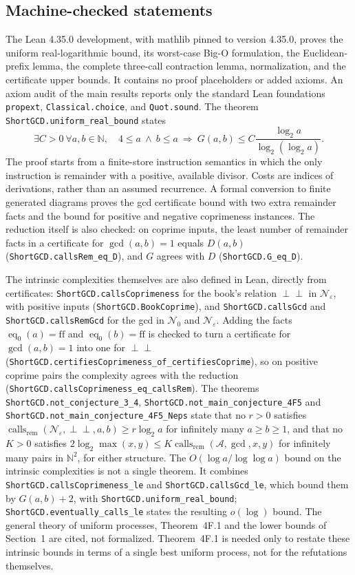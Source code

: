 \documentclass[11pt]{article}
\newcommand{\rem}{\operatorname{rem}}
\newcommand{\calls}{\operatorname{calls}}
\newcommand{\eq}{\operatorname{eq}}
\newcommand{\lean}[1]{\nolinkurl{#1}}
\begin{document}
\subsection{Machine-checked statements}
The Lean 4.35.0 development, with mathlib pinned to version 4.35.0, proves the
uniform real-logarithmic bound, its worst-case Big-O formulation, the
Euclidean-prefix lemma, the complete three-call contraction lemma, normalization,
and the certificate upper bounds. It contains no proof placeholders or added
axioms. An axiom audit of the main results reports only the standard Lean
foundations \texttt{propext}, \texttt{Classical.choice}, and \texttt{Quot.sound}.
The theorem \lean{ShortGCD.uniform_real_bound} states
\[
\exists C>0\ \forall a,b\in\mathbb N,\quad
4\leq a\ \wedge\ b\leq a\ \Longrightarrow\
G(a,b)\leq C\frac{\log_2 a}{\log_2(\log_2 a)}.
\]
The proof starts from a finite-store instruction semantics in which the only
instruction is remainder with a positive, available divisor. Costs are indices
of derivations, rather than an assumed recurrence. A formal conversion to
finite generated diagrams proves the gcd certificate bound with two extra
remainder facts and the bound for positive and negative coprimeness instances.
The reduction itself is also checked: on coprime inputs, the least number of
remainder facts in a certificate for $\gcd(a,b)=1$ equals $D(a,b)$
(\lean{ShortGCD.callsRem_eq_D}), and $G$ agrees with $D$
(\lean{ShortGCD.G_eq_D}).

The intrinsic complexities themselves are also defined in Lean, directly from
certificates: \lean{ShortGCD.callsCoprimeness} for the book's relation
$\perp\!\!\!\perp$ in $\mathcal N_\varepsilon$, with positive inputs
(\lean{ShortGCD.BookCoprime}), and \lean{ShortGCD.callsGcd} and
\lean{ShortGCD.callsRemGcd} for the gcd in $\mathcal N_0$ and
$\mathcal N_\varepsilon$. Adding the facts $\eq_0(a)=\mathrm{ff}$ and
$\eq_0(b)=\mathrm{ff}$ is checked to turn a certificate for $\gcd(a,b)=1$ into
one for $\perp\!\!\!\perp$ (\lean{ShortGCD.certifiesCoprimeness_of_certifiesCoprime}),
so on positive coprime pairs the complexity agrees with the reduction
(\lean{ShortGCD.callsCoprimeness_eq_callsRem}). The theorems
\lean{ShortGCD.not_conjecture_3_4},
\lean{ShortGCD.not_main_conjecture_4F5} and
\lean{ShortGCD.not_main_conjecture_4F5_Neps} state that no $r>0$ satisfies
$\calls_{\rem}(\mathcal N_\varepsilon,\perp\!\!\!\perp,a,b)\geq r\log_2 a$
for infinitely many $a\geq b\geq1$, and that no $K>0$ satisfies
$2\log_2\max(x,y)\leq K\calls_{\rem}(\mathcal A,\gcd,x,y)$ for infinitely
many pairs in $\mathbb N^2$, for either structure. The $O(\log a/\log\log a)$
bound on the intrinsic complexities is not a single theorem. It combines
\lean{ShortGCD.callsCoprimeness_le} and \lean{ShortGCD.callsGcd_le}, which bound
them by $G(a,b)+2$, with \lean{ShortGCD.uniform_real_bound};
\lean{ShortGCD.eventually_calls_le} states the resulting $o(\log)$ bound. The
general theory of uniform
processes, Theorem~4F.1 and the lower bounds of Section~1 are cited, not
formalized. Theorem~4F.1 is needed only to restate these intrinsic bounds in
terms of a single best uniform process, not for the refutations themselves.
\end{document}
